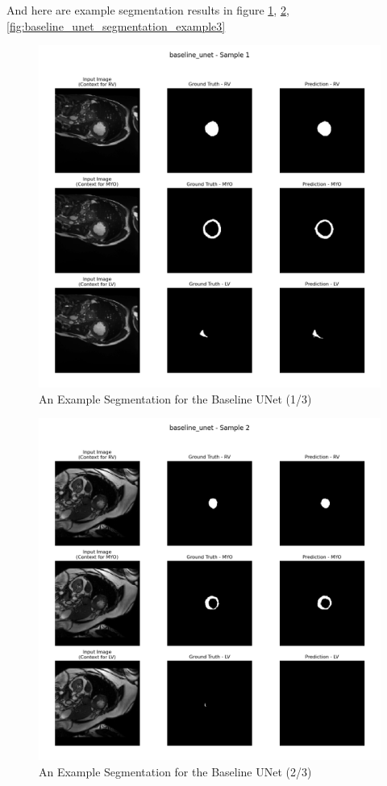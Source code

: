 \documentclass{article}
\begin{document}
And here are example segmentation results in figure \ref{fig:baseline_unet_segmentation_example1}, 
\ref{fig:baseline_unet_segmentation_example2}, \ref{fig:baseline_unet_segmentation_example3}
\begin{figure}[H]
  \centering
  \includegraphics[width=\linewidth]{../result/baseline_unet/sample_1_segmentation.png}
  \caption{An Example Segmentation for the Baseline UNet (1/3)}
  \label{fig:baseline_unet_segmentation_example1}
\end{figure}
\begin{figure}[H]
  \centering
  \includegraphics[width=\linewidth]{../result/baseline_unet/sample_2_segmentation.png}
  \caption{An Example Segmentation for the Baseline UNet (2/3)}
  \label{fig:baseline_unet_segmentation_example2}
\end{figure}
\end{document}

